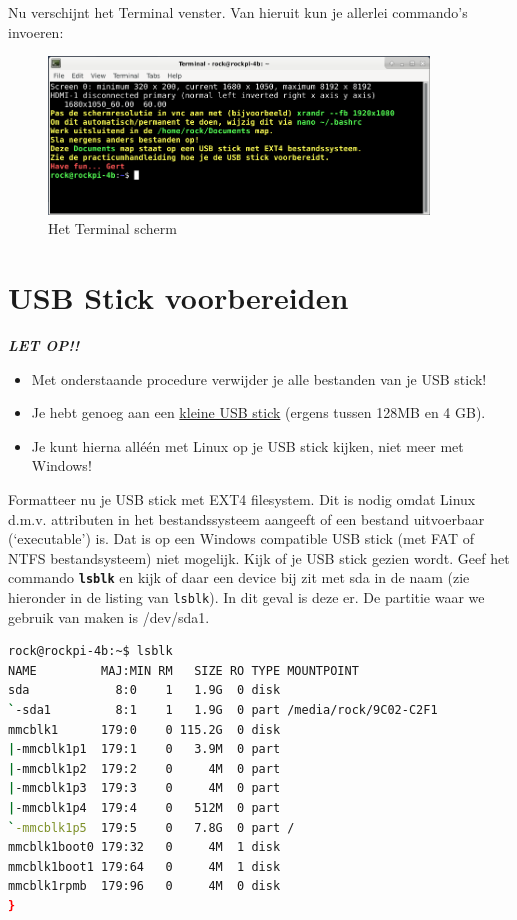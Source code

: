 Nu verschijnt het Terminal venster. Van hieruit kun je allerlei commando's invoeren:
\begin{figure}[h!]
	\centering
	\begin{center} 
		\includegraphics[width=0.9\textwidth]{figuren/terminal-inlogscherm}	
		\caption{Het Terminal scherm}
		\label{fig:terminal-inlogscherm}   
	\end{center}
\end{figure}

\hypertarget{chp:USBstick}{}
\section{USB Stick voorbereiden}
\textbf{\textit{LET OP!! }}
\begin{itemize}
	\item Met onderstaande procedure verwijder je alle bestanden van je USB stick!
	\item Je hebt genoeg aan een \hyperlink{USBinleiding}{kleine USB stick} (ergens tussen 128MB en 4 GB).
	\item Je kunt hierna alléén met Linux op je USB stick kijken, niet meer met Windows!
\end{itemize}

Formatteer nu je USB stick met EXT4 filesystem. Dit is nodig omdat Linux d.m.v. attributen in het bestandssysteem aangeeft of een bestand uitvoerbaar (‘executable’) is. Dat is op  een Windows compatible USB stick (met FAT of NTFS bestandsysteem) niet mogelijk.
Kijk of je USB stick gezien wordt. Geef het commando \textbf{\texttt{lsblk}} en kijk of daar een device bij zit met sda in de naam (zie hieronder in de listing van \texttt{lsblk}). In dit geval is deze er. De partitie waar we gebruik van maken is /dev/sda1.

\begin{lstlisting}[language=bash]
rock@rockpi-4b:~$ lsblk
NAME         MAJ:MIN RM   SIZE RO TYPE MOUNTPOINT
sda            8:0    1   1.9G  0 disk
`-sda1         8:1    1   1.9G  0 part /media/rock/9C02-C2F1
mmcblk1      179:0    0 115.2G  0 disk
|-mmcblk1p1  179:1    0   3.9M  0 part
|-mmcblk1p2  179:2    0     4M  0 part
|-mmcblk1p3  179:3    0     4M  0 part
|-mmcblk1p4  179:4    0   512M  0 part
`-mmcblk1p5  179:5    0   7.8G  0 part /
mmcblk1boot0 179:32   0     4M  1 disk
mmcblk1boot1 179:64   0     4M  1 disk
mmcblk1rpmb  179:96   0     4M  0 disk
}
\end{lstlisting}
	
